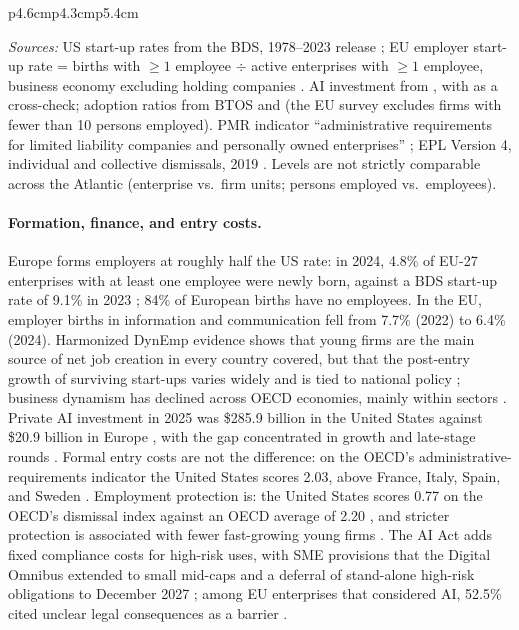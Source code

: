 \begin{table}[h]
\begin{tabular}{p{4.6cm}p{4.3cm}p{5.4cm}}
    \bottomrule
  \end{tabular}
  \par\smallskip
  \parbox{\linewidth}{\footnotesize\raggedright\textit{Sources:} US start-up rates from the BDS, 1978--2023 release \citep{bds2021}; EU employer start-up rate = births with $\geq 1$ employee $\div$ active enterprises with $\geq 1$ employee, business economy excluding holding companies \citep{eurostat2026bdsize}.
  AI investment from \citet{hai2026aiindex}, with \citet{dealroom2026ai} as a cross-check; adoption ratios from BTOS \citep{btos2026oct} and \citet{eurostat2026isoc} (the EU survey excludes firms with fewer than 10 persons employed).
  PMR indicator ``administrative requirements for limited liability companies and personally owned enterprises'' \citep{oecd2024pmr}; EPL Version 4, individual and collective dismissals, 2019 \citep{oecd2020epl}.
  Levels are not strictly comparable across the Atlantic (enterprise vs.\ firm units; persons employed vs.\ employees).}
\end{table}

\paragraph{Formation, finance, and entry costs.}
Europe forms employers at roughly half the US rate: in 2024, 4.8\% of EU-27 enterprises with at least one employee were newly born, against a BDS start-up rate of 9.1\% in 2023 \citep{eurostat2026bdsize,bds2021}; 84\% of European births have no employees.
In the EU, employer births in information and communication fell from 7.7\% (2022) to 6.4\% (2024).
Harmonized DynEmp evidence shows that young firms are the main source of net job creation in every country covered, but that the post-entry growth of surviving start-ups varies widely and is tied to national policy \citep{criscuolo2014dynamics,calvino2016no}; business dynamism has declined across OECD economies, mainly within sectors \citep{calvino2020declining}.
Private AI investment in 2025 was \$285.9 billion in the United States against \$20.9 billion in Europe \citep{hai2026aiindex}, with the gap concentrated in growth and late-stage rounds \citep{dealroom2026ai}.
Formal entry costs are not the difference: on the OECD's administrative-requirements indicator the United States scores 2.03, above France, Italy, Spain, and Sweden \citep{oecd2024pmr}.
Employment protection is: the United States scores 0.77 on the OECD's dismissal index against an OECD average of 2.20 \citep{oecd2020epl}, and stricter protection is associated with fewer fast-growing young firms \citep{bravobiosca2016drives}.
The AI Act \citep{euaiact2024} adds fixed compliance costs for high-risk uses, with SME provisions that the Digital Omnibus extended to small mid-caps and a deferral of stand-alone high-risk obligations to December 2027 \citep{euaiomnibus2026}; among EU enterprises that considered AI, 52.5\% cited unclear legal consequences as a barrier \citep{eurostat2026isoc}.

